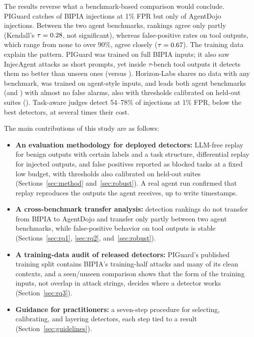 The results reverse what a benchmark-based comparison would conclude. PIGuard catches \BIPGTpr of BIPIA injections at 1\% FPR but only \ADPGTpr of AgentDojo injections. Between the two agent benchmarks, rankings agree only partly (Kendall's $\tau=0.28$, not significant), whereas false-positive rates on tool outputs, which range from none to over 90\%, agree closely ($\tau=0.67$). The training data explain the pattern. PIGuard was trained on \PGBipiaRows full BIPIA inputs; it also saw \NIASeen InjecAgent attacks as short prompts, yet inside $\tau$-bench tool outputs it detects them no better than unseen ones (\TBSeenPG versus \TBUnseenPG). Horizon-Labs shares no data with any benchmark, was trained on agent-style inputs, and leads both agent benchmarks (\MHZAD and \TBTprHZ) with almost no false alarms, also with thresholds calibrated on held-out suites (\LoHZTpr). Task-aware judges detect 54--78\% of injections at 1\% FPR, below the best detectors, at several times their cost.

The main contributions of this study are as follows:
\begin{itemize}
\item \textbf{An evaluation methodology for deployed detectors:} LLM-free replay for benign outputs with certain labels and a task structure, differential replay for injected outputs, and false positives reported as blocked tasks at a fixed low budget, with thresholds also calibrated on held-out suites (Sections~\ref{sec:method} and~\ref{sec:robust}). A real agent run confirmed that replay reproduces the outputs the agent receives, up to write timestamps.
\item \textbf{A cross-benchmark transfer analysis:} detection rankings do not transfer from BIPIA to AgentDojo and transfer only partly between two agent benchmarks, while false-positive behavior on tool outputs is stable (Sections~\ref{sec:rq1}, \ref{sec:rq2}, and~\ref{sec:robust}).
\item \textbf{A training-data audit of released detectors:} PIGuard's published training split contains BIPIA's training-half attacks and many of its clean contexts, and a seen/unseen comparison shows that the form of the training inputs, not overlap in attack strings, decides where a detector works (Section~\ref{sec:rq3}).
\item \textbf{Guidance for practitioners:} a seven-step procedure for selecting, calibrating, and layering detectors, each step tied to a result (Section~\ref{sec:guidelines}).
\end{itemize}

